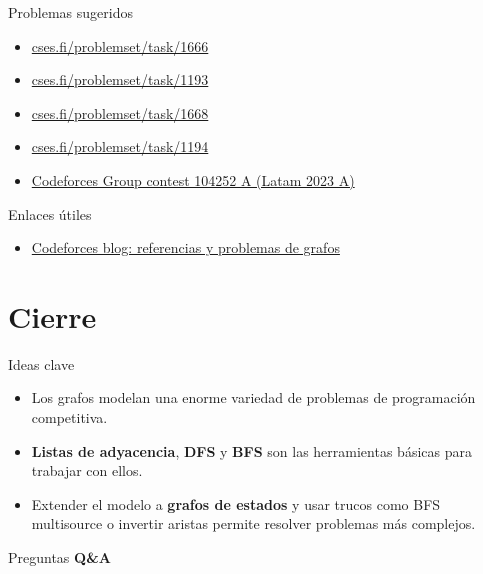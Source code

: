 \documentclass[aspectratio=169]{beamer}
\begin{document}
\begin{frame}{Problemas sugeridos}
  \begin{itemize}
    \item \href{https://cses.fi/problemset/task/1666}{cses.fi/problemset/task/1666}
    \item \href{https://cses.fi/problemset/task/1193}{cses.fi/problemset/task/1193}
    \item \href{https://cses.fi/problemset/task/1668}{cses.fi/problemset/task/1668}
    \item \href{https://cses.fi/problemset/task/1194}{cses.fi/problemset/task/1194}
    \item \href{https://codeforces.com/group/8JufKtWW7p/contest/104252/problem/A}{Codeforces Group contest 104252 A (Latam 2023 A)}
  \end{itemize}
\end{frame}

\begin{frame}{Enlaces útiles}
  \begin{itemize}
    \item \href{https://codeforces.com/blog/entry/45897}{Codeforces blog: referencias y problemas de grafos}
  \end{itemize}
\end{frame}

\section*{Cierre}

\begin{frame}{Ideas clave}
  \begin{itemize}
    \item Los grafos modelan una enorme variedad de problemas de programación competitiva.
    \item \textbf{Listas de adyacencia}, \textbf{DFS} y \textbf{BFS} son las herramientas básicas para trabajar con ellos.
    \item Extender el modelo a \textbf{grafos de estados} y usar trucos como BFS multisource o invertir aristas permite resolver problemas más complejos.
  \end{itemize}
\end{frame}

\begin{frame}{Preguntas}
  \centering
  \Huge
  \textbf{Q\&A}
\end{frame}
\end{document}
